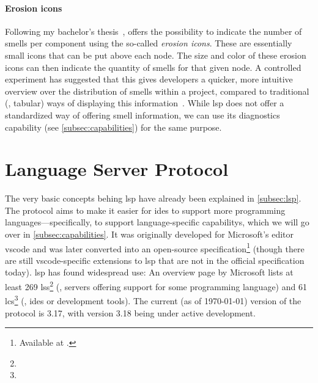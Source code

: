 \documentclass[../thesis]{subfiles}
\begin{document}
\paragraph{Erosion icons}
Following my bachelor's thesis~\cite{galperin2021}, \SEE{} offers the possibility to indicate the number of \glspl{smell} per component using the so-called \emph{erosion icons}.
These are essentially small icons that can be put above each node.
The size and color of these erosion icons can then indicate the quantity of \glspl{smell} for that given node.
A controlled experiment has suggested that this gives developers a quicker, more intuitive overview over the distribution of \glspl{smell} within a project, compared to traditional (\ie, tabular) ways of displaying this information~\cite{galperin2022}.
While \gls{lsp} does not offer a standardized way of offering \gls{smell} information, we can use its diagnostics capability (see \cref{subsec:capabilities}) for the same purpose.

\section{Language Server Protocol}\label{sec:lsp}
The very basic concepts behing \gls{lsp} have already been explained in \cref{subsec:lsp}.
The protocol aims to make it easier for \glspl{ide} to support more programming languages---specifically, to support language-specific \glspl{capability}, which we will go over in \cref{subsec:capabilities}.
It was originally developed for Microsoft's editor \gls{vscode} and was later converted into an open-source specification\footnote{
  Available at .
} (though there are still \gls{vscode}-specific extensions to \gls{lsp} that are not in the official specification today).
\gls{lsp} has found widespread use:
An overview page by Microsoft lists at least 269 \glspl{ls}\footnote{} (\ie, servers offering support for some programming language) and 61 \glspl{lc}\footnote{} (\ie, \glspl{ide} or development tools).
The current (as of \today{}) version of the protocol is 3.17, with version 3.18 being under active development.
\end{document}
